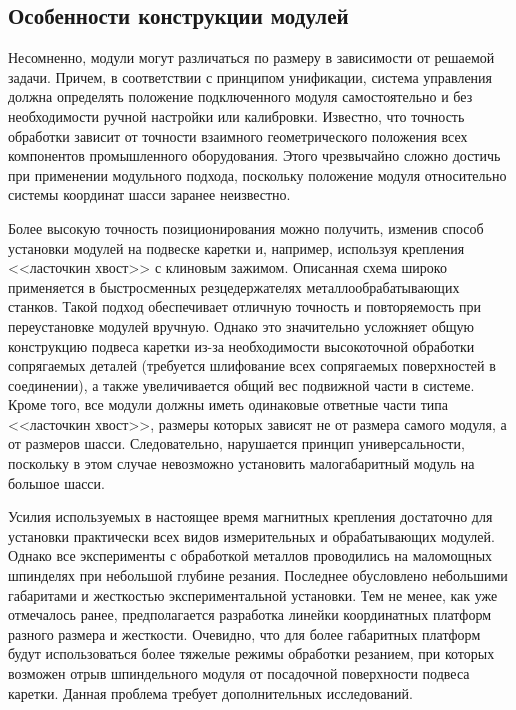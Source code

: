 \subsection{Особенности конструкции модулей}

Несомненно, модули могут различаться по размеру в зависимости от решаемой задачи. Причем, в соответствии с принципом унификации, система управления должна определять положение подключенного модуля самостоятельно и без необходимости ручной настройки или калибровки. Известно, что точность обработки зависит от точности взаимного геометрического положения всех компонентов промышленного оборудования. Этого чрезвычайно сложно достичь при применении модульного подхода, поскольку положение модуля относительно системы координат шасси заранее неизвестно.

Более высокую точность позиционирования можно получить, изменив способ установки модулей на подвеске каретки и, например, используя крепления <<ласточкин хвост>> с клиновым зажимом. Описанная схема широко применяется в быстросменных резцедержателях металлообрабатывающих станков. Такой подход обеспечивает отличную точность и повторяемость при переустановке модулей вручную. Однако это значительно усложняет общую конструкцию подвеса каретки из-за необходимости высокоточной обработки сопрягаемых деталей (требуется шлифование всех сопрягаемых поверхностей в соединении), а также увеличивается общий вес подвижной части в системе. Кроме того, все модули должны иметь одинаковые ответные части типа <<ласточкин хвост>>, размеры которых зависят не от размера самого модуля, а от размеров шасси. Следовательно, нарушается принцип универсальности, поскольку в этом случае невозможно установить малогабаритный модуль на большое шасси.

Усилия используемых в настоящее время магнитных крепления достаточно для установки практически всех видов измерительных и обрабатывающих модулей. Однако все эксперименты с обработкой металлов проводились на маломощных шпинделях при небольшой глубине резания. Последнее обусловлено небольшими габаритами и жесткостью экспериментальной установки. Тем не менее, как уже отмечалось ранее, предполагается разработка линейки координатных платформ разного размера и жесткости. Очевидно, что для более габаритных платформ будут использоваться более тяжелые режимы обработки резанием, при которых возможен отрыв шпиндельного модуля от посадочной поверхности подвеса каретки. Данная проблема требует дополнительных исследований.

